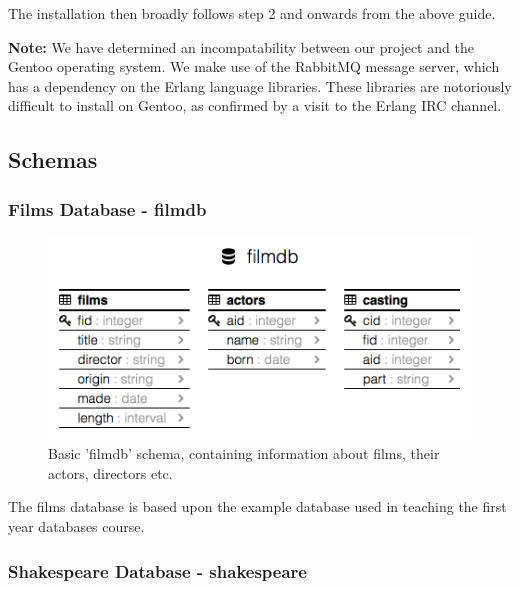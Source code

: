 \documentclass[a4paper, 11pt]{article}
\begin{document}
  The installation then broadly follows step 2 and onwards from the above
  guide. 

  \textbf{Note:} We have determined an incompatability between our project and
  the Gentoo operating system. We make use of the RabbitMQ message server,
  which has a dependency on the Erlang language libraries. These libraries
  are notoriously difficult to install on Gentoo, as confirmed by a visit to
  the Erlang IRC channel.

  \subsection{Schemas}

    \subsubsection{Films Database - filmdb}

      \begin{figure}[H]
        \includegraphics[width=\textwidth]{images/site_schema.png}
        \caption{Basic 'filmdb' schema, containing information about films,
        their actors, directors etc.}
      \end{figure}

      The films database is based upon the example database used in teaching
      the first year databases course.

    \subsubsection{Shakespeare Database - shakespeare}
\end{document}
